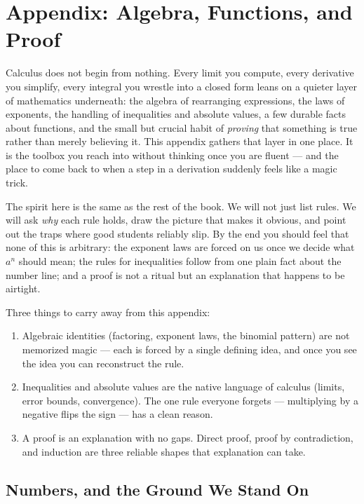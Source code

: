 \chapter{Appendix: Algebra, Functions, and Proof}

Calculus does not begin from nothing. Every limit you compute, every derivative
you simplify, every integral you wrestle into a closed form leans on a quieter
layer of mathematics underneath: the algebra of rearranging expressions, the
laws of exponents, the handling of inequalities and absolute values, a few
durable facts about functions, and the small but crucial habit of \emph{proving}
that something is true rather than merely believing it. This appendix gathers
that layer in one place. It is the toolbox you reach into without thinking once
you are fluent --- and the place to come back to when a step in a derivation
suddenly feels like a magic trick.

The spirit here is the same as the rest of the book. We will not just list rules.
We will ask \emph{why} each rule holds, draw the picture that makes it obvious,
and point out the traps where good students reliably slip. By the end you should
feel that none of this is arbitrary: the exponent laws are forced on us once we
decide what $a^n$ should mean; the rules for inequalities follow from one plain
fact about the number line; and a proof is not a ritual but an explanation that
happens to be airtight.

\begin{focusbox}
Three things to carry away from this appendix:
\begin{enumerate}
  \item Algebraic identities (factoring, exponent laws, the binomial pattern)
        are not memorized magic --- each is forced by a single defining idea, and
        once you see the idea you can reconstruct the rule.
  \item Inequalities and absolute values are the native language of calculus
        (limits, error bounds, convergence). The one rule everyone forgets ---
        multiplying by a negative flips the sign --- has a clean reason.
  \item A proof is an explanation with no gaps. Direct proof, proof by
        contradiction, and induction are three reliable shapes that explanation
        can take.
\end{enumerate}
\end{focusbox}

\section{Numbers, and the Ground We Stand On}
\label{ch40:numbers}

